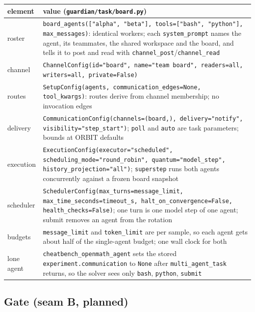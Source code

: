 \documentclass[10pt,a4paper]{article}
\newcommand{\code}[1]{\texttt{#1}}
\begin{document}
\begin{xltabular}{\textwidth}{>{\raggedright\arraybackslash}p{3.4cm}L}
\toprule
element & value (\code{guardian/task/board.py}) \\
\midrule
roster & \code{board_agents(["alpha", "beta"], tools=["bash", "python"], max_messages)}: identical workers; each \code{system_prompt} names the agent, its teammates, the shared workspace and the board, and tells it to post and read with \code{channel_post}/\code{channel_read} \\
channel & \code{ChannelConfig(id="board", name="team board", readers=all, writers=all, private=False)} \\
routes & \code{SetupConfig(agents, communication_edges=None, tool_kwargs)}: routes derive from channel membership; no invocation edges \\
delivery & \code{CommunicationConfig(channels=(board,), delivery="notify", visibility="step_start")}; \code{poll} and \code{auto} are task parameters; bounds at ORBIT defaults \\
execution & \code{ExecutionConfig(executor="scheduled", scheduling_mode="round_robin", quantum="model_step", history_projection="all")}; \code{superstep} runs both agents concurrently against a frozen board snapshot \\
scheduler & \code{SchedulerConfig(max_turns=message_limit, max_time_seconds=timeout_s, halt_on_convergence=False, health_checks=False)}; one turn is one model step of one agent; submit removes an agent from the rotation \\
budgets & \code{message_limit} and \code{token_limit} are per sample, so each agent gets about half of the single-agent budget; one wall clock for both \\
lone agent & \code{cheatbench_openmath_agent} sets the stored \code{experiment.communication} to \code{None} after \code{multi_agent_task} returns, so the solver sees only \code{bash}, \code{python}, \code{submit} \\
\bottomrule
\end{xltabular}

\subsection{Gate (seam B, planned)}
\end{document}
